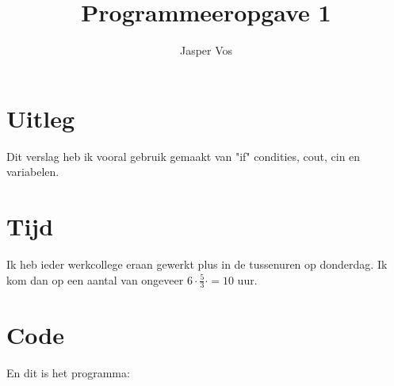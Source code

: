 \documentclass[10pt]{article}
\title{Programmeeropgave 1}
\author{Jasper Vos}
\begin{document}

\maketitle

\section{Uitleg}
Dit verslag heb ik vooral gebruik gemaakt van "if" condities, cout, cin en variabelen.

\section{Tijd}
Ik heb ieder werkcollege eraan gewerkt plus in de tussenuren op donderdag. 
Ik kom dan op een aantal van ongeveer $6\cdot\frac{5}{3} \cdot  = 10$ uur.

\section*{Code}
En dit is het programma:


\end{document}
